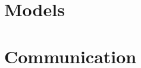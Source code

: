 \documentclass[11pt,a4paper]{report}
\begin{document}


\chapter{Models} %
\label{cha:Models}


\chapter{Communication} %
\label{cha:Communication}

\end{document}
